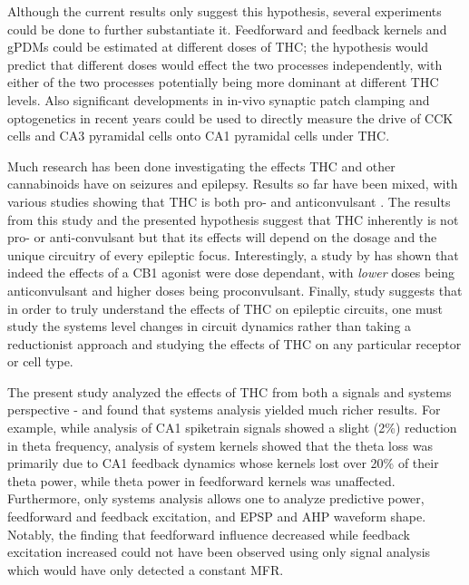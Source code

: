 \documentclass[11pt,a4paper,final]{article}
\begin{document}
Although the current results only suggest this hypothesis, several experiments could be done to further substantiate it.
Feedforward and feedback kernels and gPDMs could be estimated at different doses of THC; the hypothesis would predict that different doses would effect the two processes independently, with either of the two processes potentially being more dominant at different THC levels.
Also significant developments in in-vivo synaptic patch clamping \citep{tao15} and optogenetics in recent years could be used to directly measure the drive of CCK cells and CA3 pyramidal cells onto CA1 pyramidal cells under THC.

Much research has been done investigating the effects THC and other cannabinoids have on seizures and epilepsy.
Results so far have been mixed, with various studies showing that THC is both pro- and anticonvulsant \citep{wallace01,blair06,deshpande07,rudenko12,katona15,hill13,katona15}.
The results from this study and the presented hypothesis suggest that THC inherently is not pro- or anti-convulsant but that its effects will depend on the dosage and the unique circuitry of every epileptic focus.
Interestingly, a study by \citet{rudenko12} has shown that indeed the effects of a CB1 agonist were dose dependant, with \textit{lower} doses being anticonvulsant and higher doses being proconvulsant.
Finally, study suggests that in order to truly understand the effects of THC on epileptic circuits, one must study the systems level changes in circuit dynamics rather than taking a reductionist approach and studying the effects of THC on any particular receptor or cell type.

The present study analyzed the effects of THC from both a signals and systems perspective - and found that systems analysis yielded much richer results.
For example, while analysis of CA1 spiketrain signals showed a slight (2\%) reduction in theta frequency, analysis of system kernels showed that the theta loss was primarily due to CA1 feedback dynamics whose kernels lost over 20\% of their theta power, while theta power in feedforward kernels was unaffected.
Furthermore, only systems analysis allows one to analyze predictive power, feedforward and feedback excitation, and EPSP and AHP waveform shape. Notably, the finding that feedforward influence decreased while feedback excitation increased could not have been observed using only signal analysis which would have only detected a constant MFR.
\end{document}
